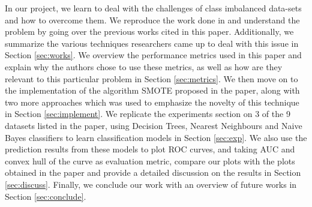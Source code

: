 \documentclass[10pt,journal,compsoc]{IEEEtran}
\begin{document}
In our project, we learn to deal with the challenges of class imbalanced data-sets and how to overcome them. We reproduce the work done in \cite{smote} and understand the problem by going over the previous works cited in this paper. Additionally, we summarize the various techniques researchers came up to deal with this issue in Section \ref{sec:works}. We overview the performance metrics used in this paper and explain why the authors chose to use these metrics, as well as how are they relevant to this particular problem in Section \ref{sec:metrics}. We then move on to the implementation of the algorithm SMOTE proposed in the paper, along with two more approaches which was used to emphasize the novelty of this technique in Section \ref{sec:implement}. We replicate the experiments section on 3 of the 9 datasets listed in the paper, using Decision Trees, Nearest Neighbours and Naive Bayes classifiers to learn classification models in Section \ref{sec:exp}. We also use the prediction results from these models to plot ROC curves, and taking AUC and convex hull of the curve as evaluation metric, compare our plots with the plots obtained in the paper and provide a detailed discussion on the results in Section \ref{sec:discuss}. Finally, we conclude our work with an overview of future works in Section \ref{sec:conclude}. 





%
%
\end{document}
